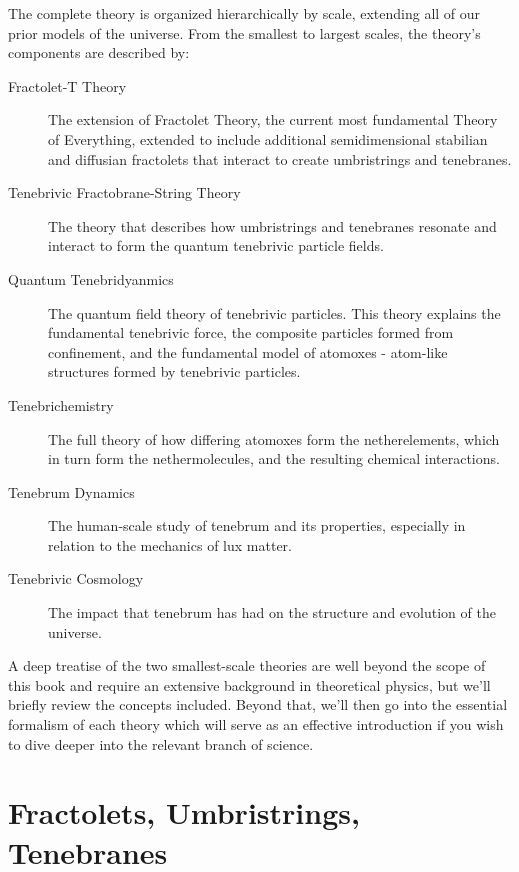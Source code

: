The complete theory is organized hierarchically by scale, extending all of our
prior models of the universe. From the smallest to largest scales, the theory's
components are described by:
\begin{description}
  \item[Fractolet-T Theory] The extension of Fractolet Theory, the current most
    fundamental Theory of Everything, extended to include additional
    semidimensional stabilian and diffusian fractolets that interact to create
    umbristrings and tenebranes.
  \item[Tenebrivic Fractobrane-String Theory] The theory that describes how
    umbristrings and tenebranes resonate and interact to form the quantum
    tenebrivic particle fields.
  \item[Quantum Tenebridyanmics] The quantum field theory of tenebrivic particles. This
    theory explains the fundamental tenebrivic force, the composite particles
    formed from confinement, and the fundamental model of atomoxes - atom-like
    structures formed by tenebrivic particles.
  \item[Tenebrichemistry] The full theory of how differing atomoxes form the
    netherelements, which in turn form the nethermolecules, and the resulting
    chemical interactions.
  \item[Tenebrum Dynamics] The human-scale study of tenebrum and its properties,
    especially in relation to the mechanics of lux matter.
  \item[Tenebrivic Cosmology] The impact that tenebrum has had on the structure and
    evolution of the universe.
\end{description}

A deep treatise of the two smallest-scale theories are well beyond the scope of
this book and require an extensive background in theoretical physics, but we'll
briefly review the concepts included. Beyond that, we'll then go into the
essential formalism of each theory which will serve as an effective
introduction if you wish to dive deeper into the relevant branch of science.

\section{Fractolets, Umbristrings, Tenebranes}



